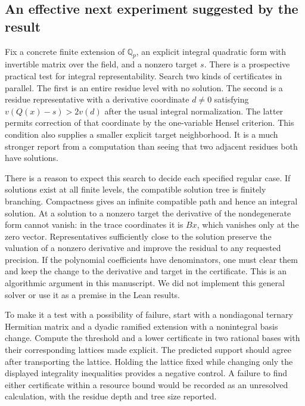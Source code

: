 \documentclass[12pt,letterpaper]{article}
\begin{document}
\subsection{An effective next experiment suggested by the result}
Fix a concrete finite extension of $\mathbb Q_p$, an explicit integral quadratic form with invertible matrix over the field, and a nonzero target $s$. There is a prospective practical test for integral representability. Search two kinds of certificates in parallel. The first is an entire residue level with no solution. The second is a residue representative with a derivative coordinate $d\ne0$ satisfying $v(Q(x)-s)>2v(d)$ after the usual integral normalization. The latter permits correction of that coordinate by the one-variable Hensel criterion. This condition also supplies a smaller explicit target neighborhood. It is a much stronger report from a computation than seeing that two adjacent residues both have solutions.
\par
There is a reason to expect this search to decide each specified regular case. If solutions exist at all finite levels, the compatible solution tree is finitely branching. Compactness gives an infinite compatible path and hence an integral solution. At a solution to a nonzero target the derivative of the nondegenerate form cannot vanish: in the trace coordinates it is $Bx$, which vanishes only at the zero vector. Representatives sufficiently close to the solution preserve the valuation of a nonzero derivative and improve the residual to any requested precision. If the polynomial coefficients have denominators, one must clear them and keep the change to the derivative and target in the certificate. This is an algorithmic argument in this manuscript. We did not implement this general solver or use it as a premise in the Lean results.
\par
To make it a test with a possibility of failure, start with a nondiagonal ternary Hermitian matrix and a dyadic ramified extension with a nonintegral basis change. Compute the threshold and a lower certificate in two rational bases with their corresponding lattices made explicit. The predicted support should agree after transporting the lattice. Holding the lattice fixed while changing only the displayed integrality inequalities provides a negative control. A failure to find either certificate within a resource bound would be recorded as an unresolved calculation, with the residue depth and tree size reported.
\end{document}

